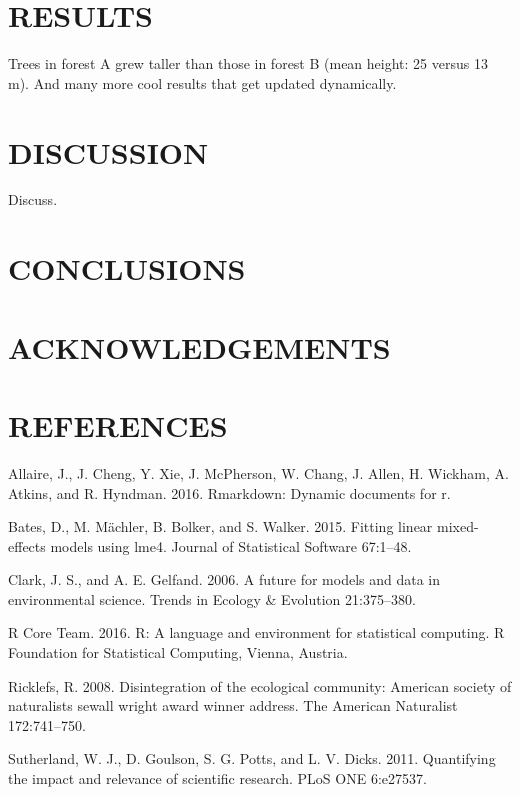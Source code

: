 \documentclass[11pt,a4paper]{article}
\begin{document}
\section{RESULTS}\label{results}

Trees in forest A grew taller than those in forest B (mean height: 25
versus 13 m). And many more cool results that get updated dynamically.

\section{DISCUSSION}\label{discussion}

Discuss.

\section{CONCLUSIONS}\label{conclusions}

\section{ACKNOWLEDGEMENTS}\label{acknowledgements}

\section{REFERENCES}\label{references}

\hypertarget{refs}{}
\hypertarget{ref-Allaireux5f2016}{}
Allaire, J., J. Cheng, Y. Xie, J. McPherson, W. Chang, J. Allen, H.
Wickham, A. Atkins, and R. Hyndman. 2016. Rmarkdown: Dynamic documents
for r.

\hypertarget{ref-Batesux5f2015}{}
Bates, D., M. Mächler, B. Bolker, and S. Walker. 2015. Fitting linear
mixed-effects models using lme4. Journal of Statistical Software
67:1--48.

\hypertarget{ref-Clarkux5f2006}{}
Clark, J. S., and A. E. Gelfand. 2006. A future for models and data in
environmental science. Trends in Ecology \& Evolution 21:375--380.

\hypertarget{ref-Rux5fCoreux5fTeamux5f2016}{}
R Core Team. 2016. R: A language and environment for statistical
computing. R Foundation for Statistical Computing, Vienna, Austria.

\hypertarget{ref-ricklefs2008disintegration}{}
Ricklefs, R. 2008. Disintegration of the ecological community: American
society of naturalists sewall wright award winner address. The American
Naturalist 172:741--750.

\hypertarget{ref-Sutherland2011}{}
Sutherland, W. J., D. Goulson, S. G. Potts, and L. V. Dicks. 2011.
Quantifying the impact and relevance of scientific research. PLoS ONE
6:e27537.
\end{document}
